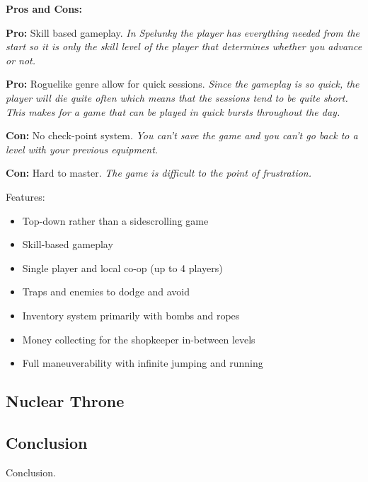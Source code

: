 \documentclass[12p]{article}
\begin{document}
\textbf{Pros and Cons:}

\textbf{Pro:} Skill based gameplay. \emph{In Spelunky the player has everything needed from the start so it is only the skill level of the player that determines whether you advance or not.}

\textbf{Pro:} Roguelike genre allow for quick sessions. \emph{Since the gameplay is so quick, the player will die quite often which means that the sessions tend to be quite short. This makes for a game that can be played in quick bursts throughout the day.}

\textbf{Con:} No check-point system. \emph{You can't save the game and you can't go back to a level with your previous equipment.}

\textbf{Con:} Hard to master. \emph{The game is difficult to the point of frustration.}

Features:

\begin{itemize}
  \item Top-down rather than a sidescrolling game
  \item Skill-based gameplay
  \item Single player and local co-op (up to 4 players)
  \item Traps and enemies to dodge and avoid
  \item Inventory system primarily with bombs and ropes
  \item Money collecting for the shopkeeper in-between levels
  \item Full maneuverability with infinite jumping and running
\end{itemize}


\subsection{Nuclear Throne}


\subsection{Conclusion}
Conclusion.

\end{document}
